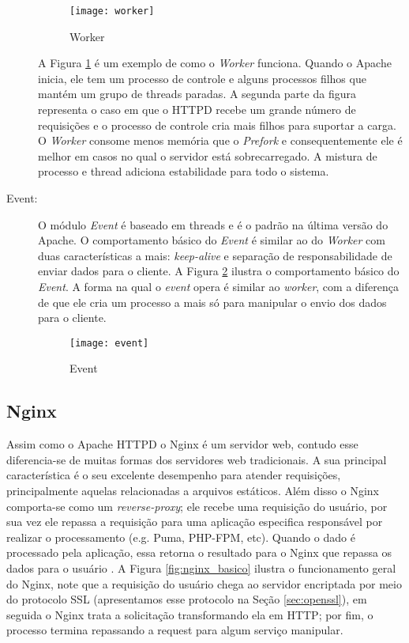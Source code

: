 \begin{description}
\begin{figure}[!h]
  \centering
  \texttt{[image: worker]} 
  \caption{Worker}
  \label{fig:worker} 
\end{figure}

A Figura \ref{fig:worker} é um exemplo de como o \textit{Worker} funciona.
Quando o Apache inicia, ele tem um processo de controle e alguns processos
filhos que mantém um grupo de threads paradas. A segunda parte da figura
representa o caso em que o HTTPD recebe um grande número de requisições e o
processo de controle cria mais filhos para suportar a carga. O \textit{Worker}
consome menos memória que o \textit{Prefork} e consequentemente ele é melhor em
casos no qual o servidor está sobrecarregado.  A mistura de processo e thread
adiciona estabilidade para todo o sistema.

	\item [Event:] O módulo \textit{Event} é baseado em threads e é o padrão na
última versão do Apache. O comportamento básico do \textit{Event} é similar ao
do \textit{Worker} com duas características a mais: \textit{keep-alive} e
separação de responsabilidade de enviar dados para o cliente. A Figura
\ref{fig:event} ilustra o comportamento básico do \textit{Event}. A forma na
qual o \textit{event} opera é similar ao \textit{worker}, com a diferença de
que ele cria um processo a mais só para manipular o envio dos dados para o
cliente.

\begin{figure}[!h]
  \centering
  \texttt{[image: event]} 
  \caption{Event}
  \label{fig:event} 
\end{figure}

\end{description}

\subsection{Nginx}

Assim como o Apache HTTPD o Nginx é um servidor web, contudo esse diferencia-se
de muitas formas dos servidores web tradicionais. A sua principal
característica é o seu excelente desempenho para atender requisições,
principalmente aquelas relacionadas a arquivos estáticos. Além disso o Nginx
comporta-se como um \textit{reverse-proxy}; ele recebe uma requisição do
usuário, por sua vez ele repassa a requisição para uma aplicação especifica
responsável por realizar o processamento (e.g. Puma, PHP-FPM, etc). Quando o
dado é processado pela aplicação, essa retorna o resultado para o Nginx que
repassa os dados para o usuário \citep{soni}. A Figura \ref{fig:nginx_basico}
ilustra o funcionamento geral do Nginx, note que a requisição do usuário chega
ao servidor encriptada por meio do protocolo SSL (apresentamos esse protocolo
na Seção \ref{sec:openssl}), em seguida o Nginx trata a solicitação
transformando ela em HTTP; por fim, o processo termina repassando a request
para algum serviço manipular.

